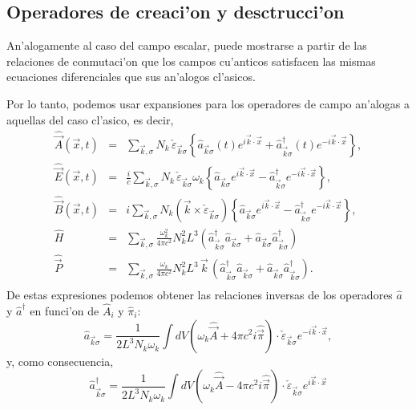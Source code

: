 \subsection{Operadores de creaci'on y desctrucci'on}
An'alogamente al caso del campo escalar, puede mostrarse a partir de las
relaciones de conmutaci'on que los campos cu'anticos satisfacen las mismas
ecuaciones diferenciales que sus an'alogos cl'asicos.

Por lo tanto, podemos usar expansiones para los operadores de campo an'alogas a
aquellas del caso cl'asico, es decir,
\begin{eqnarray}
\hat{\vec{A}}(\vec{x},t)  &=&
\sum_{\vec{k},\sigma}N_k\,\check{\varepsilon}_{\vec{k}\sigma}\left\{
\hat{a}_{\vec{k}\sigma}(t)e^{i\vec{k}\cdot\vec{x}}+\hat{a}_{\vec{k}\sigma}
^\dagger (t)e^{-i\vec{k}\cdot\vec{x}}\right\} ,\\
\hat{\vec{E}}(\vec{x},t)  & =
&\frac{i}{c}\sum_{\vec{k},\sigma}N_k\,\check{\varepsilon}_{\vec{k}\sigma}\omega_
{k}\left\{
\hat{a}_{\vec{k}\sigma}e^{i\vec{k}\cdot\vec{x}}-\hat{a}_{\vec{k}\sigma}^\dagger
e^{-i\vec{k}\cdot\vec{x}}\right\}, \\
\hat{\vec{B}}(\vec{x},t) & = &i\sum_{\vec{k},\sigma}N_k\left(
\vec{k}\times\check{\varepsilon}_{\vec{k}\sigma}\right) \left\{
\hat{a}_{\vec{k}\sigma}e^{i\vec{k}\cdot\vec{x}}-\hat{a}_{\vec{k}\sigma}^\dagger
e^{-i\vec{k}\cdot\vec{x}}\right\} ,\\
\hat{H} & = &\sum_{\vec{k},\sigma}\frac{\omega_{k}^2}{4\pi c^2}N_k^2L^3\left(
\hat{a}_{\vec{k}\sigma}^\dagger \hat{a}_{\vec{k}\sigma}+ \hat{a}_{\vec{k}\sigma}
\hat{a}_{\vec{k}\sigma}^\dagger\right)  \\
\hat{\vec{P}} & = &\sum_{\vec{k},\sigma}\frac{\omega_{k}}{4\pi
c^2}N_k^2L^3\,\vec{k}\,\left( \hat{a}_{\vec{k}\sigma}^\dagger
\hat{a}_{\vec{k}\sigma}+ \hat{a}_{\vec{k}\sigma}
\hat{a}_{\vec{k}\sigma}^\dagger\right) .\\
\end{eqnarray}
De estas expresiones podemos obtener las relaciones inversas de los operadores
$\hat{a}$ y $\hat{a}^\dagger$ en funci'on de $\hat{A}_i$ y $\hat{\pi}_i$:
\begin{equation}
\hat{a}_{\vec{k}\sigma}=\frac{1}{2L^3N_k\omega_k}\int dV \left(\omega_{k}%
\hat{\vec{A}}+4\pi c^2 i \hat{\vec{\pi}}\right) \cdot
\check{\varepsilon}_{\vec{k}\sigma}e^{-i\vec{k}\cdot\vec{x}},
\end{equation}
y, como consecuencia,
\begin{equation}
\hat{a}^\dagger_{\vec{k}\sigma}=\frac{1}{2L^3N_k\omega_k}\int dV
\left(\omega_{k}%
\hat{\vec{A}}-4\pi c^2 i \hat{\vec{\pi}}\right) \cdot
\check{\varepsilon}_{\vec{k}\sigma}e^{i\vec{k}\cdot\vec{x}}%
\end{equation}
